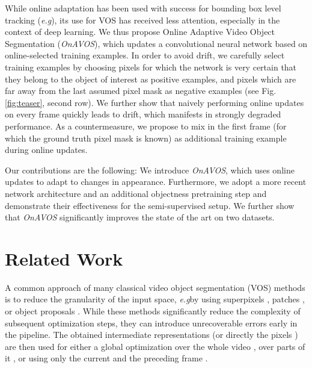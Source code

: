 \documentclass{bmvc2k}
\newcommand{\methodname}[1]{\mbox{\emph{#1}}}
\def\eg{\emph{e.g}\bmvaOneDot}
\newcommand{\PARbegin}[1]{\noindent {\bf #1~}}
\begin{document}
While online adaptation has been used with success for bounding box level tracking (\eg \cite{TLD, boostingandvision, mdnet, Wang13NIPS, Li16TIP}), its use for VOS \cite{Papoutsakis13IVC, Ellis12ACCV, Bai09TOG, Bai10ECCV} has received less attention, especially in the context of deep learning. We thus propose Online Adaptive Video Object Segmentation (\methodname{OnAVOS}), which updates a convolutional neural network based on online-selected training examples. In order to avoid drift, we carefully select training examples by choosing pixels for which the network is very certain that they belong to the object of interest as positive examples, and pixels which are far away from the last assumed pixel mask as negative examples (see Fig. \ref{fig:teaser}, second row). We further show that naively performing online updates on every frame quickly leads to drift, which manifests in strongly degraded performance. As a countermeasure, we propose to mix in the first frame (for which the ground truth pixel mask is known) as additional training example during online updates.


Our contributions are the following: We introduce \methodname{OnAVOS}, which uses online updates to adapt to changes in appearance. Furthermore, we adopt a more recent network architecture and an additional objectness pretraining step \cite{pixelobjectness, fusionseg} and demonstrate their effectiveness for the semi-supervised setup. We further show that \methodname{OnAVOS} significantly improves the state of the art on two datasets.

\vspace{-1pt}
\section{Related Work}


\PARbegin{Video Object Segmentation.}
A common approach of many classical video object segmentation (VOS) methods is to reduce the granularity of the input space, \eg by using superpixels \cite{temporal_superpixels, eff_hier_graph}, patches  \cite{seamseg, jumpcut}, or object proposals \cite{fcproposals}. While these methods significantly reduce the complexity of subsequent optimization steps, they can introduce unrecoverable errors early in the pipeline. The obtained intermediate representations (or directly the pixels \cite{bilateralvidseg}) are then used for either a global optimization over the whole video \cite{bilateralvidseg, fcproposals}, over parts of it \cite{eff_hier_graph}, or using only the current and the preceding frame \cite{temporal_superpixels, jumpcut, seamseg}.
\end{document}
